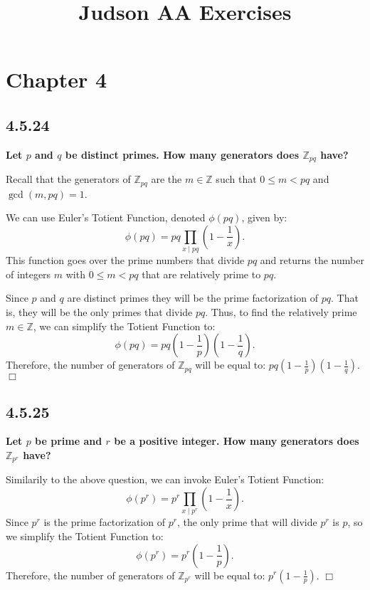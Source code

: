 \documentclass[11pt, a4paper]{article}
\title{Judson AA Exercises}
\author{}
\date{}
\begin{document}
\maketitle 
\tableofcontents

\newpage
\section{Chapter 4}

\subsection{4.5.24}
\textbf{Let $p$ and $q$ be distinct primes. How many generators does $\mathbb{Z}_{pq}$ have?}

Recall that the generators of $\mathbb{Z}_{pq}$ are the $m \in \mathbb{Z}$ such that $0 \leq m < pq$ and $\gcd(m, pq) = 1$. 

We can use Euler's Totient Function, denoted $\phi(pq)$, given by:
\[
  \phi(pq) = pq \prod_{x \mid pq} \left ( 1 - \frac{1}{x} \right ).
\]
This function goes over the prime numbers that divide $pq$ and returns the number of integers $m$ with $0 \leq m < pq$ that are relatively prime to $pq$. 

Since $p$ and $q$ are distinct primes they will be the prime factorization of $pq$. That is, they will be the only primes that divide $pq$. Thus, to find the relatively prime $m \in \mathbb{Z}$, we can simplify the Totient Function to:
\[
  \phi(pq) = pq \left ( 1 - \frac{1}{p} \right ) \left ( 1 - \frac{1}{q} \right ).
\]
Therefore, the number of generators of $\mathbb{Z}_{pq}$ will be equal to: $pq \left ( 1 - \frac{1}{p} \right ) \left ( 1 - \frac{1}{q} \right )$. $\Box$

\subsection{4.5.25}
\textbf{Let $p$ be prime and $r$ be a positive integer. How many generators does $\mathbb{Z}_{p^r}$ have?}

Similarily to the above question, we can invoke Euler's Totient Function:
\[
  \phi(p^r) = p^r \prod_{x \mid p^r} \left ( 1 - \frac{1}{x} \right ).
\]
Since $p^r$ is the prime factorization of $p^r$, the only prime that will divide $p^r$ is $p$, so we simplify the Totient Function to:
\[
  \phi(p^r) = p^r \left ( 1 - \frac{1}{p} \right ).
\]
Therefore, the number of generators of $\mathbb{Z}_{p^r}$ will be equal to: $p^r \left ( 1 - \frac{1}{p} \right )$. $\Box$
\end{document}
